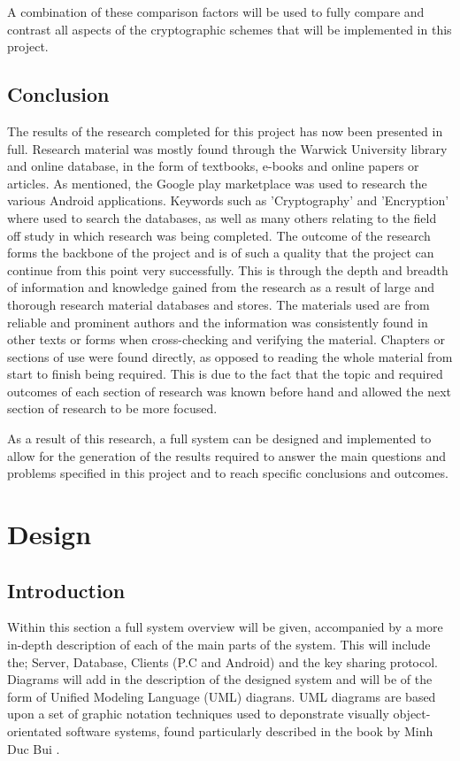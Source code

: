 \documentclass[a4paper,10pt]{report}
\begin{document}
A combination of these comparison factors will be used to fully compare and contrast all aspects of the cryptographic schemes that will be implemented in this project. 

\section{Conclusion}

The results of the research completed for this project has now been presented in full. Research material was mostly found through the Warwick University library and online database, in the form of textbooks, e-books and online papers or articles. As mentioned, the Google play marketplace was used to research the various Android applications. Keywords such as 'Cryptography' and 'Encryption' where used to search the databases, as well as many others relating to the field off study in which research was being completed. The outcome of the research forms the backbone of the project and is of such a quality that the project can continue from this point very successfully. This is through the depth and breadth of information and knowledge gained from the research as a result of large and thorough research material databases and stores. The materials used are from reliable and prominent authors and the information was consistently found in other texts or forms when cross-checking and verifying the material. Chapters or sections of use were found directly, as opposed to reading the whole material from start to finish being required. This is due to the fact that the topic and required outcomes of each section of research was known before hand and allowed the next section of research to be more focused.

As a result of this research, a full system can be designed and implemented to allow for the generation of the results required to answer the main questions and problems specified in this project and to reach specific conclusions and outcomes.  

\chapter{Design}

\section{Introduction}

Within this section a full system overview will be given, accompanied by a more in-depth description of each of the main parts of the system. This will include the; Server, Database, Clients (P.C and Android) and the key sharing protocol. Diagrams will add in the description of the designed system and will be of the form of Unified Modeling Language (UML) diagrans. UML diagrams are based upon a set of graphic notation techniques used to deponstrate visually object-orientated software systems, found particularly described in the book by Minh Duc Bui \cite{umlbook}.
\end{document}
